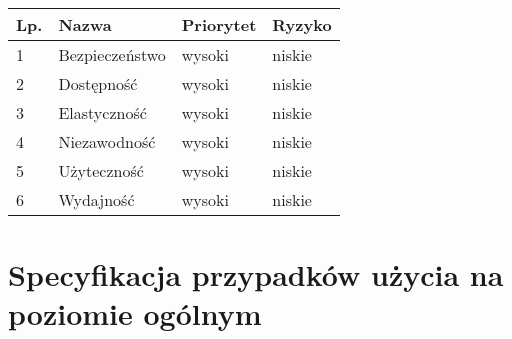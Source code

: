 \begin{table}[h]
	\begin{center}
		\begin{tabular}{| l | l | l | l |}
			\hline
			\textbf{Lp.} & \textbf{Nazwa} & \textbf{Priorytet} & \textbf{Ryzyko} \\
			\hline
			1 & Bezpieczeństwo & wysoki & niskie \\
			\hline
			2 & Dostępność & wysoki & niskie \\
			\hline
			3 & Elastyczność & wysoki & niskie \\
			\hline
			4 & Niezawodność & wysoki & niskie \\
			\hline
			5 & Użyteczność & wysoki & niskie \\
			\hline
			6 & Wydajność & wysoki & niskie \\
			\hline
		\end{tabular}
	\end{center}
\end{table}
\FloatBarrier

\section{Specyfikacja przypadków użycia na poziomie ogólnym}